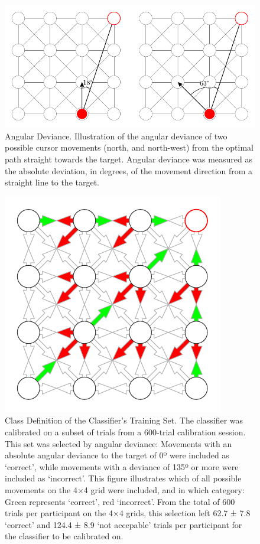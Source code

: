 \begin{figure}[t]
    \renewcommand\thefigure{\ref{chapter:nat}.S2}
    \centering
    \includegraphics[scale=1.25]{figures/nat-app-fig-s2.pdf}
    \caption[Angular deviance.]{Angular Deviance. Illustration of the angular deviance of two possible cursor movements (north, and north-west) from the optimal path straight towards the target. Angular deviance was measured as the absolute deviation, in degrees, of the movement direction from a straight line to the target.}
\end{figure}

\begin{figure}[b]
    \renewcommand\thefigure{\ref{chapter:nat}.S3}
    \centering
    \includegraphics[scale=1.25]{figures/nat-app-fig-s3.pdf}
    \caption[Class definitions of the classifier's training set.]{Class Definition of the Classifier's Training Set. The classifier was calibrated on a subset of trials from a 600-trial calibration session. This set was selected by angular deviance: Movements with an absolute angular deviance to the target of 0º were included as `correct', while movements with a deviance of 135º or more were included as `incorrect'. This figure illustrates which of all possible movements on the 4$\times$4 grid were included, and in which category: Green represents `correct', red `incorrect'. From the total of 600 trials per participant on the 4$\times$4 grids, this selection left 62.7 ± 7.8 `correct' and 124.4 ± 8.9 `not accepable' trials per participant for the classifier to be calibrated on.}
\end{figure}

